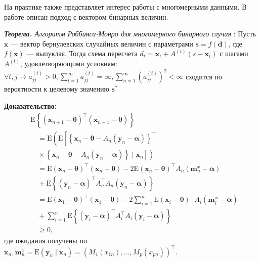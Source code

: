 На практике также представляет интерес работы с многомерными данными. В работе \cite{xiong2018efficient} описан подход с вектором бинарных величин.

\textit{\textbf{Теорема.} Алгоритм Роббинса-Монро для многомерного бинарного случая} \cite{xiong2018efficient}:
 Пусть $\mathbf{x}$ --- вектор бернулевских случайных величин с параметрами $\mathbf{s}=f(\mathbf{d})$, 
 где $f(\mathbf{x})$ --- выпуклая.
 Тогда схема пересчета $d_t=\mathbf{x}_t + A^{(t)} (s - \mathbf{x}_t)$ с шагами $A^{(t)}$, удовлетворяющими условиям:
 $\forall t,j \rightarrow a_{jj}^{(t)} >0,
 \sum^{\infty}_{t=1} a_{jj}^{(t)} = \infty,
  \sum_{n=1}^\infty (a^{(t)}_{jj})^2 < \infty$
сходится по вероятности к целевому значению $\mathbf{s}^*$

\textbf{Доказательство:} 
\begin{equation}
    \begin{aligned}
        & \mathrm{E}\left\{\left(\mathbf{x}_{n+1}-\boldsymbol{\theta}\right)^{\top}\left(\mathbf{x}_{n+1}-\boldsymbol{\theta}\right)\right\} \\
        & \quad=\mathrm{E}\left(\mathrm { E } \left[\left\{\mathbf{x}_{n}-\boldsymbol{\theta}-A_{n}\left(\mathbf{y}_{n}-\boldsymbol{\alpha}\right)\right\}^{\top}\right.\right. \\
        & \left.\left.\quad \times\left\{\mathbf{x}_{n}-\boldsymbol{\theta}-A_{n}\left(\mathbf{y}_{n}-\boldsymbol{\alpha}\right)\right\} \mid \mathbf{x}_{n}\right]\right) \\
        & \quad=\mathrm{E}\left(\mathbf{x}_{n}-\boldsymbol{\theta}\right)^{\top}\left(\mathbf{x}_{n}-\boldsymbol{\theta}\right)-2 \mathrm{E}\left(\mathbf{x}_{n}-\boldsymbol{\theta}\right)^{\top} A_{n}\left(\mathbf{m}_{n}^{x}-\boldsymbol{\alpha}\right) \\
        & \quad+\mathrm{E}\left\{\left(\mathbf{y}_{n}-\boldsymbol{\alpha}\right)^{\top} A_{n}^{\top} A_{n}\left(\mathbf{y}_{n}-\boldsymbol{\alpha}\right)\right\} \\
        & \quad=\mathrm{E}\left(\mathbf{x}_{1}-\boldsymbol{\theta}\right)^{\top}\left(\mathbf{x}_{1}-\boldsymbol{\theta}\right)-2 \sum_{i=1}^{n} \mathrm{E}\left(\mathbf{x}_{i}-\boldsymbol{\theta}\right)^{\top} A_{i}\left(\mathbf{m}_{i}^{x}-\boldsymbol{\alpha}\right) \\
        & \quad+\sum_{i=1}^{n} \mathrm{E}\left\{\left(\mathbf{y}_{i}-\boldsymbol{\alpha}\right)^{\top} A_{i}^{\top} A_{i}\left(\mathbf{y}_{i}-\boldsymbol{\alpha}\right)\right\} \\
        & \quad \geq 0,
    \end{aligned} 
\end{equation}
где ожидания получены по $\mathbf{x}_{n}, \mathbf{m}_{n}^{x}=
\mathrm{E}\left(\mathbf{y}_{n} \mid \mathbf{x}_{n}\right)=\left(M_{1}\left(x_{1 n}\right),
\ldots, M_{p}\left(x_{p n}\right)\right)^{\top}$.
 
